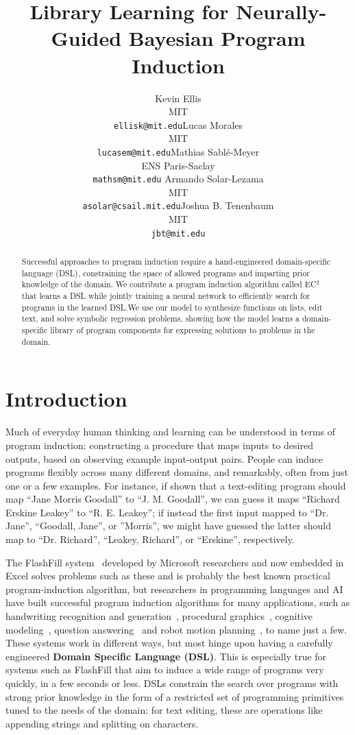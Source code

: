 \documentclass{article}
\title{Library Learning for Neurally-Guided Bayesian Program Induction}
\author{
  Kevin Ellis\\MIT\\\texttt{ellisk@mit.edu}\And Lucas Morales\\MIT\\\texttt{lucasem@mit.edu}\And Mathias Sabl\'e-Meyer\\ENS Paris-Saclay\\\texttt{mathsm@mit.edu}
  \AND
  Armando Solar-Lezama\\MIT\\\texttt{asolar@csail.mit.edu}\And Joshua B. Tenenbaum\\MIT\\\texttt{jbt@mit.edu}
}
\newcommand{\system}{\textsc{EC$^2$} }
\begin{document}

\maketitle

\begin{abstract}
  Successful approaches to program induction require a hand-engineered
  domain-specific language (DSL), constraining the space of allowed
  programs and imparting prior knowledge of the domain.  We contribute
  a program induction algorithm called \system that learns a DSL while
  jointly training a neural network to efficiently search for programs
  in the learned DSL.\@ We use our model to synthesize functions on lists,
  edit text, and solve symbolic regression problems, showing how the
  model learns a domain-specific library of program components for
  expressing solutions to problems in the domain.
\end{abstract}


\section{Introduction}

Much of everyday human thinking and learning can be understood in
terms of program induction: constructing a procedure that maps inputs
to desired outputs, based on observing example input-output pairs.
People can induce programs flexibly across many different domains, and
remarkably, often from just one or a few examples.  For instance, if
shown that a text-editing program should map ``Jane Morris Goodall''
to ``J. M. Goodall'', we can guess it maps ``Richard Erskine Leakey''
to ``R. E. Leakey''; if instead the first input mapped to
``Dr. Jane'', ``Goodall, Jane'', or ''Morris'', we might have guessed
the latter should map to ``Dr. Richard'', ``Leakey, Richard'', or
``Erskine'', respectively.

The FlashFill system~\cite{gulwani2011automating} developed by
Microsoft researchers and now embedded in Excel solves problems such
as these and is probably the best known practical program-induction
algorithm, but researchers in programming languages and AI have built
successful program induction algorithms for many applications, such as
handwriting recognition and generation~\cite{lake2015human},
procedural graphics~\cite{ellis2017learning}, cognitive
modeling~\cite{DBLP:journals/cogsr/SchmidK11}, question
answering~\cite{johnson2017clevr} and robot motion
planning~\cite{devlin2017neural}, to name just a few.  These systems
work in different ways, but most hinge upon having a carefully
engineered \textbf{Domain Specific Language (DSL)}.  This is
especially true for systems such as FlashFill that aim to induce a
wide range of programs very quickly, in a few seconds or less.  DSLs
constrain the search over programs with strong prior knowledge in the
form of a restricted set of programming primitives tuned to the needs
of the domain: for text editing, these are operations like appending
strings and splitting on characters.
\end{document}
